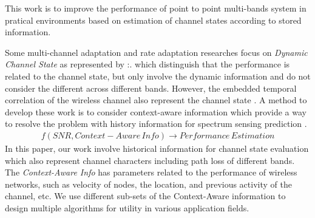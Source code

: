 

This work is to improve the performance of point to point multi-bands system in pratical environments based on estimation of channel states according to stored information.


Some multi-channel adaptation and rate adaptation researches focus on \emph{Dynamic Channel State} as represented by \cite{cordeiro2007c,MOAR}:. 
which distinguish that the performance is related to the channel state, but only involve the dynamic information and do not consider the different across different bands. 
However, the embedded temporal correlation of the wireless channel also represent the channel state \cite{liuastra}. 
A method to develop these work is to consider context-aware information which provide a way to resolve the problem with history information for spectrum sensing prediction \cite{yucek2009survey}.
\begin{align}
f(SNR,Context-Aware\, Info) \rightarrow Performance\, Estimation
\end{align}
In this paper, our work involve historical information for channel state evaluation which also represent channel characters including path loss of different bands.
The \emph{Context-Aware Info} has parameters related to the performance of wireless networks, such as velocity of nodes, the location, and previous activity of the channel, etc. 
We use different sub-sets of the Context-Aware information to design multiple algorithms for utility in various application fields. 


